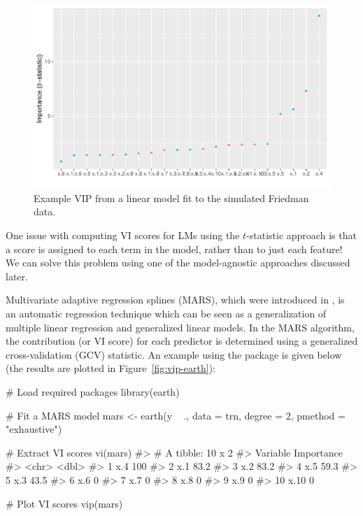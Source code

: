 \begin{figure}[!htb]
  \centering 
  \includegraphics[width=1\linewidth]{figures/vip-step} 
  \caption{Example VIP from a linear model fit to the simulated Friedman data.}
  \label{fig:vip-step}
\end{figure}

One issue with computing VI scores for LMs using the $t$-statistic approach is that a score is assigned to each term in the model, rather than to just each feature! We can solve this problem using one of the model-agnostic approaches discussed later.

Multivariate adaptive regression splines (MARS), which were introduced in \citet{multivariate-friedman-1991}, is an automatic regression technique which can be seen as a generalization of multiple linear regression and generalized linear models. In the MARS algorithm, the contribution (or VI score) for each predictor is determined using a generalized cross-validation (GCV) statistic. An example using the  package \citep{earth-pkg} is given below (the results are plotted in Figure~\ref{fig:vip-earth}):

\begin{example}
# Load required packages
library(earth)

# Fit a MARS model
mars <- earth(y ~ ., data = trn, degree = 2, pmethod = "exhaustive")

# Extract VI scores
vi(mars)
#> # A tibble: 10 x 2
#>    Variable Importance
#>    <chr>         <dbl>
#>  1 x.4           100  
#>  2 x.1            83.2
#>  3 x.2            83.2
#>  4 x.5            59.3
#>  5 x.3            43.5
#>  6 x.6             0  
#>  7 x.7             0  
#>  8 x.8             0  
#>  9 x.9             0  
#> 10 x.10            0

# Plot VI scores
vip(mars)
\end{example}

